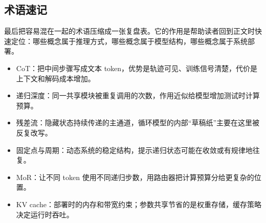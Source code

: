 \subsection{术语速记}

最后把容易混在一起的术语压缩成一张复盘表。它的作用是帮助读者回到正文时快速定位：哪些概念属于推理方式，哪些概念属于模型结构，哪些概念属于系统部署。

\begin{itemize}
  \item CoT：把中间步骤写成文本 token，优势是轨迹可见、训练信号清楚，代价是上下文和解码成本增加。
  \item 递归深度：同一共享模块被重复调用的次数，作用近似给模型增加测试时计算预算。
  \item 残差流：隐藏状态持续传递的主通道，循环模型的内部“草稿纸”主要在这里被反复改写。
  \item 固定点与周期：动态系统的稳定结构，提示递归状态可能在收敛或有规律地往复。
  \item MoR：让不同 token 使用不同递归步数，用路由器把计算预算分给更复杂的位置。
  \item KV cache：部署时的内存和带宽约束；参数共享节省的是权重存储，缓存策略决定运行时吞吐。
\end{itemize}

